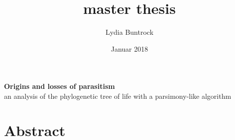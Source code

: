 
\author{Lydia Buntrock}
\title{master thesis}
\date{Januar 2018}



  \begin{titlepage}
    \pagestyle{empty}
  	
    	\vspace{20mm}
    	\begin{Large}
    	    \textbf{Origins and losses of parasitism}\\
          an analysis of the phylogenetic tree of life with a parsimony-like algorithm\\
    	\end{Large}

  	\clearpage
  \end{titlepage}

\chapter*{Abstract}

\tableofcontents
\clearpage

